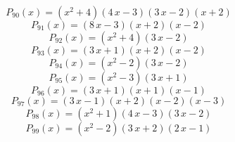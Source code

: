 \subitem \begin{dmath*}P_{90}(x) = {\left(x^{2} + 4\right)} {\left(4 \, x - 3\right)} {\left(3 \, x - 2\right)} {\left(x + 2\right)} \end{dmath*}\vspace{- 1.20000000000000 cm}
\subitem \begin{dmath*}P_{91}(x) = {\left(8 \, x - 3\right)} {\left(x + 2\right)} {\left(x - 2\right)} \end{dmath*}\vspace{- 1.20000000000000 cm}
\subitem \begin{dmath*}P_{92}(x) = {\left(x^{2} + 4\right)} {\left(3 \, x - 2\right)} \end{dmath*}\vspace{- 1.20000000000000 cm}
\subitem \begin{dmath*}P_{93}(x) = {\left(3 \, x + 1\right)} {\left(x + 2\right)} {\left(x - 2\right)} \end{dmath*}\vspace{- 1.20000000000000 cm}
\subitem \begin{dmath*}P_{94}(x) = {\left(x^{2} - 2\right)} {\left(3 \, x - 2\right)} \end{dmath*}\vspace{- 1.20000000000000 cm}
\subitem \begin{dmath*}P_{95}(x) = {\left(x^{2} - 3\right)} {\left(3 \, x + 1\right)} \end{dmath*}\vspace{- 1.20000000000000 cm}
\subitem \begin{dmath*}P_{96}(x) = {\left(3 \, x + 1\right)} {\left(x + 1\right)} {\left(x - 1\right)} \end{dmath*}\vspace{- 1.20000000000000 cm}
\subitem \begin{dmath*}P_{97}(x) = {\left(3 \, x - 1\right)} {\left(x + 2\right)} {\left(x - 2\right)} {\left(x - 3\right)} \end{dmath*}\vspace{- 1.20000000000000 cm}
\subitem \begin{dmath*}P_{98}(x) = {\left(x^{2} + 1\right)} {\left(4 \, x - 3\right)} {\left(3 \, x - 2\right)} \end{dmath*}\vspace{- 1.20000000000000 cm}
\subitem \begin{dmath*}P_{99}(x) = {\left(x^{2} - 2\right)} {\left(3 \, x + 2\right)} {\left(2 \, x - 1\right)} \end{dmath*}\vspace{- 1.20000000000000 cm}
